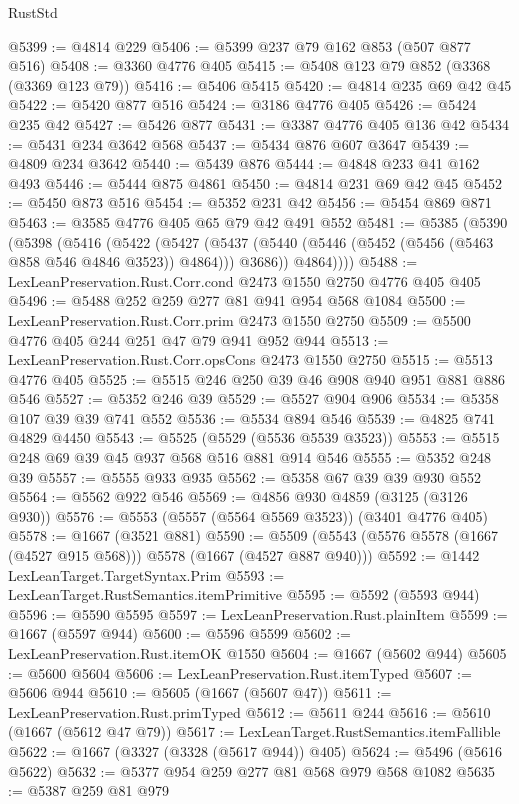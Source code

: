\begin{lexlean}{RustStd}
\begin{coremodule}
@5399 := @4814 @229
@5406 := @5399 @237 @79 @162 @853 (@507 @877 @516)
@5408 := @3360 @4776 @405
@5415 := @5408 @123 @79 @852 (@3368 (@3369 @123 @79))
@5416 := @5406 @5415
@5420 := @4814 @235 @69 @42 @45
@5422 := @5420 @877 @516
@5424 := @3186 @4776 @405
@5426 := @5424 @235 @42
@5427 := @5426 @877
@5431 := @3387 @4776 @405 @136 @42
@5434 := @5431 @234 @3642 @568
@5437 := @5434 @876 @607 @3647
@5439 := @4809 @234 @3642
@5440 := @5439 @876
@5444 := @4848 @233 @41 @162 @493
@5446 := @5444 @875 @4861
@5450 := @4814 @231 @69 @42 @45
@5452 := @5450 @873 @516
@5454 := @5352 @231 @42
@5456 := @5454 @869 @871
@5463 := @3585 @4776 @405 @65 @79 @42 @491 @552
@5481 := @5385
    (@5390
      (@5398
        (@5416
          (@5422
            (@5427
              (@5437 (@5440 (@5446 (@5452 (@5456 (@5463 @858 @546 @4846 @3523)) @4864))) @3686))
            @4864))))
@5488 := LexLeanPreservation.Rust.Corr.cond @2473 @1550 @2750 @4776 @405 @405
@5496 := @5488 @252 @259 @277 @81 @941 @954 @568 @1084
@5500 := LexLeanPreservation.Rust.Corr.prim @2473 @1550 @2750
@5509 := @5500 @4776 @405 @244 @251 @47 @79 @941 @952 @944
@5513 := LexLeanPreservation.Rust.Corr.opsCons @2473 @1550 @2750
@5515 := @5513 @4776 @405
@5525 := @5515 @246 @250 @39 @46 @908 @940 @951 @881 @886 @546
@5527 := @5352 @246 @39
@5529 := @5527 @904 @906
@5534 := @5358 @107 @39 @39 @741 @552
@5536 := @5534 @894 @546
@5539 := @4825 @741 @4829 @4450
@5543 := @5525 (@5529 (@5536 @5539 @3523))
@5553 := @5515 @248 @69 @39 @45 @937 @568 @516 @881 @914 @546
@5555 := @5352 @248 @39
@5557 := @5555 @933 @935
@5562 := @5358 @67 @39 @39 @930 @552
@5564 := @5562 @922 @546
@5569 := @4856 @930 @4859 (@3125 (@3126 @930))
@5576 := @5553 (@5557 (@5564 @5569 @3523)) (@3401 @4776 @405)
@5578 := @1667 (@3521 @881)
@5590 := @5509 (@5543 (@5576 @5578 (@1667 (@4527 @915 @568))) @5578 (@1667 (@4527 @887 @940)))
@5592 := @1442 LexLeanTarget.TargetSyntax.Prim
@5593 := LexLeanTarget.RustSemantics.itemPrimitive
@5595 := @5592 (@5593 @944)
@5596 := @5590 @5595
@5597 := LexLeanPreservation.Rust.plainItem
@5599 := @1667 (@5597 @944)
@5600 := @5596 @5599
@5602 := LexLeanPreservation.Rust.itemOK @1550
@5604 := @1667 (@5602 @944)
@5605 := @5600 @5604
@5606 := LexLeanPreservation.Rust.itemTyped
@5607 := @5606 @944
@5610 := @5605 (@1667 (@5607 @47))
@5611 := LexLeanPreservation.Rust.primTyped
@5612 := @5611 @244
@5616 := @5610 (@1667 (@5612 @47 @79))
@5617 := LexLeanTarget.RustSemantics.itemFallible
@5622 := @1667 (@3327 (@3328 (@5617 @944)) @405)
@5624 := @5496 (@5616 @5622)
@5632 := @5377 @954 @259 @277 @81 @568 @979 @568 @1082
@5635 := @5387 @259 @81 @979

\end{coremodule}
\end{lexlean}
